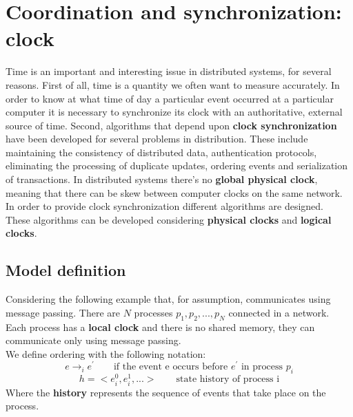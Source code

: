 \documentclass[11pt,a4paper]{article}
\begin{document}



\section{Coordination and synchronization: clock}
Time is an important and interesting issue in distributed systems, for several
reasons. First of all, time is a quantity we often want to measure accurately. In order to know at what time of day a particular event occurred at a particular computer it is necessary to synchronize its clock with an authoritative, external source of time.
Second, algorithms that depend upon \textbf{clock synchronization} have been developed for several problems in distribution. These include maintaining the consistency of distributed data, authentication protocols, eliminating the processing of duplicate updates, ordering events and serialization of transactions.
In distributed systems there's no \textbf{global physical clock}, meaning that there can be skew between computer clocks on the same network. In order to provide clock synchronization different algorithms are designed.\\
These algorithms can be developed considering \textbf{physical clocks} and \textbf{logical clocks}.

\subsection{Model definition}
Considering the following example that, for assumption, communicates using message passing.
There are $N$ processes $p_1, p_2,...,p_N$ connected in a network. Each process has a \textbf{local clock} and there is no shared memory, they can communicate only using message passing.\\
We define ordering with the following notation:
$$e \rightarrow_i e^\prime \qquad \text{if the event e occurs before } e^\prime \text{ in process } p_i$$
$$h = <e_i^0, e_i^1,...> \qquad \text{state history of process i}$$
Where the \textbf{history} represents the sequence of events that take place on the process.
\end{document}

